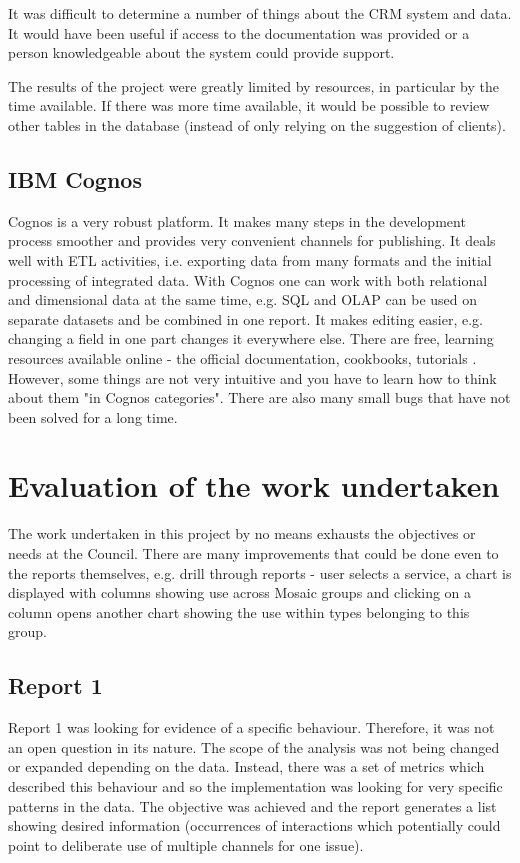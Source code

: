 It was difficult to determine a number of things about the CRM system and data. It would have been useful if access to the documentation was provided or a person knowledgeable about the system could provide support.

The results of the project were greatly limited by resources, in particular by the time available. If there was more time available, it would be possible to review other tables in the database (instead of only relying on the suggestion of clients).
		
		\subsection{IBM Cognos}

Cognos is a very robust platform. It makes many steps in the development process smoother and provides very convenient channels for publishing. It deals well with ETL activities, i.e. exporting data from many formats and the initial processing of integrated data. With Cognos one can work with both relational and dimensional data at the same time, e.g. SQL and OLAP can be used on separate datasets and be combined in one report. It makes editing easier, e.g. changing a field in one part changes it everywhere else. There are free, learning resources available online - the official documentation, cookbooks, tutorials \citep{MIT}. However, some things are not very intuitive and you have to learn how to think about them "in Cognos categories". There are also many small bugs that have not been solved for a long time.

	\section{Evaluation of the work undertaken}
	
The work undertaken in this project by no means exhausts the objectives or needs at the Council. There are many improvements that could be done even to the reports themselves, e.g. drill through reports - user selects a service, a chart is displayed with columns showing use across Mosaic groups and clicking on a column opens another chart showing the use within types belonging to this group.

		\subsection{Report 1}
		
Report 1 was looking for evidence of a specific behaviour. Therefore, it was not an open question in its nature. The scope of the analysis was not being changed or expanded depending on the data. Instead, there was a set of metrics which described this behaviour and so the implementation was looking for very specific patterns in the data. The objective was achieved and the report generates a list showing desired information (occurrences of interactions which potentially could point to deliberate use of multiple channels for one issue).
		
